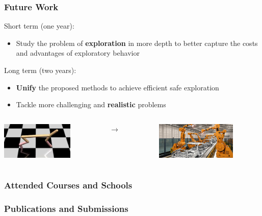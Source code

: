 \documentclass{beamer}
\begin{document}
\begin{frame}
\frametitle{Future Work}

Short term (one year):
\begin{itemize}
	\item Study the problem of \textbf{exploration} in more depth to better capture the costs and advantages of exploratory behavior
\end{itemize}

\vfill

Long term (two years):
\begin{itemize}
	\item \textbf{Unify} the proposed methods to achieve efficient safe exploration
	\item Tackle more challenging and \textbf{realistic} problems
\end{itemize}

\vfill

\begin{columns}
	\begin{column}{0.35\textwidth}
		\includegraphics[height=50pt]{pics/cheetah.jpeg}
	\end{column}
	\begin{column}{0.1\textwidth}
		\centering
		\LARGE$\to$
	\end{column}
	\begin{column}{0.35\textwidth}
	\includegraphics[height=50pt]{pics/factory.jpg}
	\end{column}
\end{columns}

\end{frame}


\begin{frame}
\frametitle{Attended Courses and Schools}


\end{frame}


\begin{frame}
\frametitle{Publications and Submissions}


\end{frame}
\end{document}
